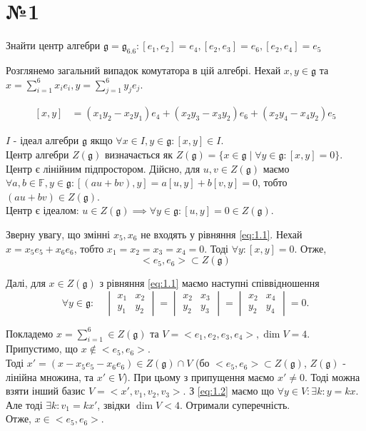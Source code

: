 \documentclass[10pt, a4paper]{article} %
\newcommand{\g}{\mathfrak{g}}
\begin{document}
\section*{№1}

\begin{mdframed}
    Знайти центр алгебри \quad
    $\g = \g_{6.6} : [e_1,e_2]=e_4, [e_2,e_3]=e_6, [e_2,e_4]=e_5$
\end{mdframed}

Розглянемо загальний випадок комутатора в цій алгебрі.
Нехай $x,y \in \g$ та $x = \sum_{i=1}^6 x_ie_i, y = \sum_{j=1}^6 y_je_j$.

\begin{align} \label{eq:1.1}    
    [x,y] &= ( x_1y_2-x_2y_1 ) e_4  + ( x_2y_3 - x_3y_2 ) e_6 + ( x_2y_4 - x_4y_2 ) e_5
\end{align}

$I$ - ідеал алгебри $\g$ якщо $\forall x \in I, y \in \g: [x,y] \in I$.\\
Центр алгебри $Z(\g)$ визначається як $Z(\g) = \{x \in \g \mid \forall y \in \g: [x,y] = 0\}$.\\
Центр є лінійним підпростором. 
Дійсно, для $u,v\in Z(\g)$ маємо $\forall a,b \in \mathbb{F}, y\in\g: [(au+bv),y] = a[u,y] + b[v,y] = 0$,
тобто $(au+bv) \in Z(\g)$.\\
Центр є ідеалом:
$u \in Z(\g) \implies \forall y\in\g: [u,y] = 0 \in Z(\g)$.

Зверну увагу, що змінні $x_5, x_6$ не входять у рівняння \ref{eq:1.1}.
Нехай $x = x_5e_5 + x_6e_6$, тобто $x_1=x_2=x_3=x_4=0$. Тоді $\forall y: [x,y] = 0$.
Отже, 
\[<e_5, e_6> \subset Z(\g)\]

Далі, для $x\in Z(\g)$ з рівняння \ref{eq:1.1} маємо наступні співвідношення
\begin{equation} \label{eq:1.2}
    \forall y \in \g: \quad \begin{vmatrix}
        x_1 & x_2 \\ y_1 & y_2
    \end{vmatrix} =
    \begin{vmatrix}
        x_2 & x_3 \\ y_2 & y_3
    \end{vmatrix} =  
    \begin{vmatrix}
        x_2 & x_4 \\ y_2 & y_4
    \end{vmatrix} = 0.
\end{equation}

Покладемо $x = \sum_{i=1}^6 \in Z(\g)$ та $V = <e_1,e_2,e_3,e_4>, \dim V = 4$.\\
Припустимо, що $x \notin <e_5,e_6>$.\\
Тоді $x' = (x - x_5e_5 - x_6e_6) \in Z(\g) \cap V$ 
(бо $<e_5, e_6> \subset Z(\g)$, $Z(\g)$ - лінійна множина, та $x' \in V$).
При цьому з припущення маємо $x' \ne 0$. 
Тоді можна взяти інший базис $V = <x',v_1,v_2,v_3>$.
З \ref{eq:1.2} маємо що $\forall y \in V: \exists k: y=kx$.
Але тоді $\exists k: v_1 = kx'$, звідки $\dim V < 4$. Отримали суперечність. \\
Отже, $x \in <e_5,e_6>$.
\end{document}

